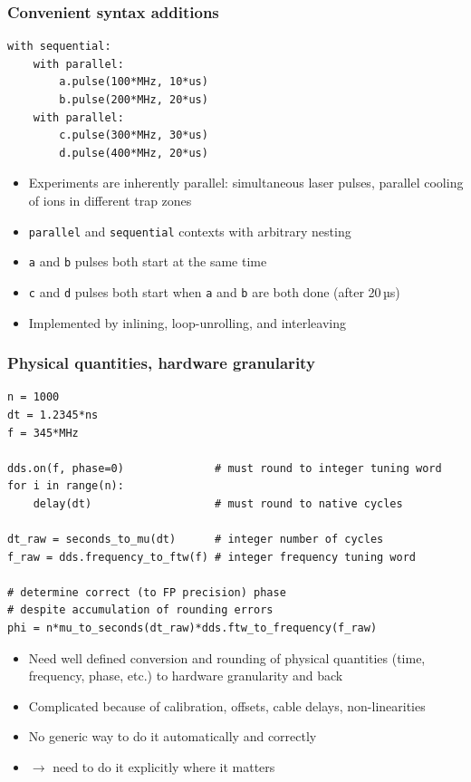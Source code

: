 \documentclass[final,presentation,compress]{beamer}
\begin{document}
\begin{frame}[fragile]
  \frametitle{Convenient syntax additions}
  \footnotesize
  \begin{verbatim}
with sequential:
    with parallel:
        a.pulse(100*MHz, 10*us)
        b.pulse(200*MHz, 20*us)
    with parallel:
        c.pulse(300*MHz, 30*us)
        d.pulse(400*MHz, 20*us)
  \end{verbatim}

  \begin{itemize}
    \item Experiments are inherently parallel:
        simultaneous laser pulses, parallel cooling of ions in different trap zones
    \item \verb!parallel! and \verb!sequential! contexts with arbitrary nesting
    \item \verb!a! and \verb!b! pulses both start at the same time
    \item \verb!c! and \verb!d! pulses both start when \verb!a! and \verb!b! are both done
      (after 20\,µs)
    \item Implemented by inlining, loop-unrolling, and interleaving
  \end{itemize}
\end{frame}


\begin{frame}[fragile]
  \frametitle{Physical quantities, hardware granularity}
  \footnotesize
  \begin{verbatim}
n = 1000
dt = 1.2345*ns
f = 345*MHz

dds.on(f, phase=0)              # must round to integer tuning word
for i in range(n):
    delay(dt)                   # must round to native cycles

dt_raw = seconds_to_mu(dt)      # integer number of cycles
f_raw = dds.frequency_to_ftw(f) # integer frequency tuning word

# determine correct (to FP precision) phase
# despite accumulation of rounding errors
phi = n*mu_to_seconds(dt_raw)*dds.ftw_to_frequency(f_raw)
  \end{verbatim}

  \begin{itemize}
    \item Need well defined conversion and rounding of physical quantities
      (time, frequency, phase, etc.) to hardware granularity and back
    \item Complicated because of calibration, offsets, cable delays,
      non-linearities
    \item No generic way to do it automatically and correctly
    \item $\rightarrow$ need to do it explicitly where it matters
  \end{itemize}
\end{frame}
\end{document}

